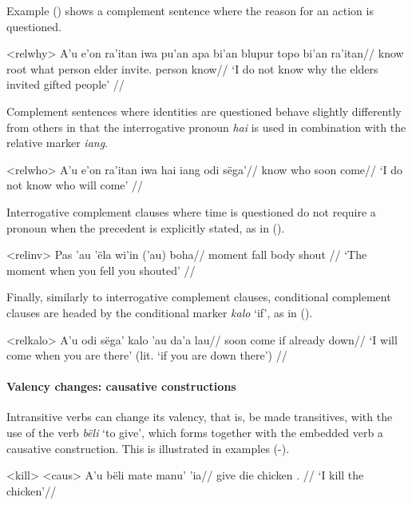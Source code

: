 \documentclass[../hewa_main-subfiles.tex]{subfiles}
\begin{document}
Example () shows a complement sentence where the reason for an action is questioned.

\ex<relwhy> %
\begingl %
\gla A'u e'on ra'itan iwa pu'an apa bi'an blupur topo bi'an ra'itan//
\glb \First{}\Sg{} \Neg{} know \Neg{} root what person elder invite.\Third{}\Pl{} person know//
\glft `I do not know why the elders invited gifted people' // 
\endgl
\xe

Complement sentences where identities are questioned behave slightly differently from others in that the interrogative pronoun \textit{hai} is used in combination with the relative marker \textit{iang}.

\ex<relwho> %
\begingl %
\gla A'u e'on ra'itan iwa hai iang odi sëga'//
\glb \First{}\Sg{} \Neg{} know \Neg{} who \Rel{} soon come//
\glft `I do not know who will come' // 
\endgl
\xe

Interrogative complement clauses where time is questioned do not require a pronoun when the precedent is explicitly stated, as in ().

\ex<relinv> %
\begingl %
\gla Pas 'au 'ëla wi'in ('au) boha//
\glb moment \Second{}\Sg{} fall body \Second{}\Sg{} shout //
\glft `The moment when you fell you shouted' // 
\endgl
\xe

Finally, similarly to interrogative complement clauses, conditional complement clauses are headed by the conditional marker \textit{kalo} `if', as in ().

\ex<relkalo> %
\begingl %
\gla A'u odi sëga' kalo 'au da'a lau//
\glb \First{}\Sg{} soon come if \Second{}\Sg{} already down//
\glft `I will come when you are there' (lit. `if you are down there') // 
\endgl
\xe


\paragraph{Valency changes: causative constructions}

Intransitive verbs can change its valency, that is, be made transitives, with the use of the verb \textit{bëli} `to give', which forms together with the embedded verb a causative construction. This is illustrated in examples (-).

\pex<kill> %
\a<caus> %
\begingl %
\gla A'u bëli mate manu' 'ia//
\glb \First{}\Sg{} give die chicken \Def{}.\Sg{} //
\glft `I kill the chicken'//
\endgl
\end{document}
